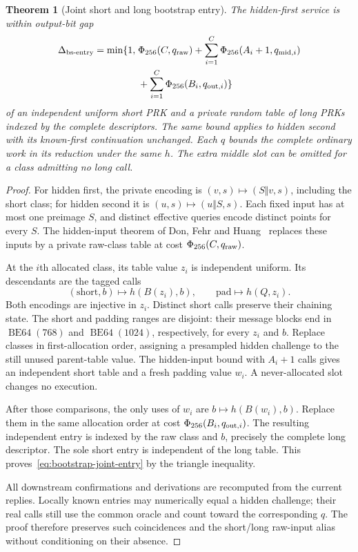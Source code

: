 \documentclass[pdflatex]{sn-jnl}
\theoremstyle{thmstyleone}
\newtheorem{theorem}{Theorem}[section]
\theoremstyle{thmstylethree}
\theoremstyle{thmstyletwo}
\begin{document}
\begin{theorem}[Joint short and long bootstrap entry]
\label{thm:bootstrap-joint-entry}
The hidden-first service is within output-bit gap
\begin{equation}
 \begin{split}
 \Delta_{\rm bs\text{-}entry}=\min\{1,\;&\Phi_{256}(C,q_{\rm raw})
  +\sum_{i=1}^{C}\Phi_{256}(A_i+1,q_{{\rm mid},i})\\
  &+\sum_{i=1}^{C}\Phi_{256}(B_i,q_{{\rm out},i})\}
 \end{split}
 \label{eq:bootstrap-joint-entry}
\end{equation}
of an independent uniform short PRK and a private random table of long
PRKs indexed by the complete descriptors. The same bound applies to
hidden second with its known-first continuation unchanged. Each $q$
bounds the complete ordinary work in its reduction under the same $h$.
The extra middle slot can be omitted for a class admitting no long call.
\end{theorem}
\begin{proof}
For hidden first, the private encoding is
$(v,s)\mapsto(S\Vert v,s)$, including the short class; for hidden
second it is $(u,s)\mapsto(u\Vert S,s)$. Each fixed input has at most
one preimage $S$, and distinct effective queries encode distinct points
for every $S$. The hidden-input theorem of Don, Fehr and
Huang~\cite[Theorem~2]{dfh2022} replaces these inputs by a private
raw-class table at cost $\Phi_{256}(C,q_{\rm raw})$.

At the $i$th allocated class, its table value $z_i$ is independent uniform.
Its descendants are the tagged calls
\[
 (\mathrm{short},b)\longmapsto h(B(z_i),b),\qquad
 \mathrm{pad}\longmapsto h(Q,z_i).
\]
Both encodings are injective in $z_i$. Distinct short calls preserve
their chaining state. The short and padding ranges are disjoint: their
message blocks end in $\operatorname{BE64}(768)$ and
$\operatorname{BE64}(1024)$, respectively, for every $z_i$ and $b$.
Replace classes in first-allocation order, assigning a presampled hidden
challenge to the still unused parent-table value. The hidden-input
bound with $A_i+1$ calls gives an independent short table and a fresh
padding value $w_i$. A never-allocated slot changes no execution.

After those comparisons, the only uses of $w_i$ are
$b\mapsto h(B(w_i),b)$. Replace them in the same allocation order
at cost $\Phi_{256}(B_i,q_{{\rm out},i})$. The resulting independent
entry is indexed by the raw class and $b$, precisely the complete long
descriptor. The sole short entry is independent of the long table.
This proves~\eqref{eq:bootstrap-joint-entry} by the triangle inequality.

All downstream confirmations and derivations are recomputed from the
current replies. Locally known entries may numerically equal a hidden
challenge; their real calls still use the common oracle and count toward
the corresponding $q$. The proof therefore preserves such coincidences
and the short/long raw-input alias without conditioning on their absence.
\end{proof}
\end{document}
